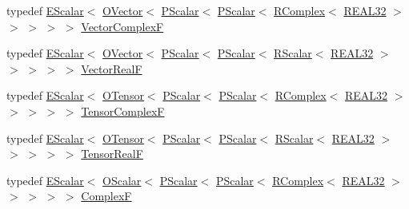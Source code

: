 \begin{DoxyCompactItemize}
\item 
typedef \mbox{\hyperlink{classENSEM_1_1EScalar}{E\+Scalar}}$<$ \mbox{\hyperlink{classENSEM_1_1OVector}{O\+Vector}}$<$ \mbox{\hyperlink{classENSEM_1_1PScalar}{P\+Scalar}}$<$ \mbox{\hyperlink{classENSEM_1_1PScalar}{P\+Scalar}}$<$ \mbox{\hyperlink{classENSEM_1_1RComplex}{R\+Complex}}$<$ \mbox{\hyperlink{namespaceENSEM_a7540d01191172323e9073283d772576d}{R\+E\+A\+L32}} $>$ $>$ $>$ $>$ $>$ \mbox{\hyperlink{group__defs_ga6a0a527d27235e5a8e8f28342eb7676f}{Vector\+ComplexF}}
\item 
typedef \mbox{\hyperlink{classENSEM_1_1EScalar}{E\+Scalar}}$<$ \mbox{\hyperlink{classENSEM_1_1OVector}{O\+Vector}}$<$ \mbox{\hyperlink{classENSEM_1_1PScalar}{P\+Scalar}}$<$ \mbox{\hyperlink{classENSEM_1_1PScalar}{P\+Scalar}}$<$ \mbox{\hyperlink{classENSEM_1_1RScalar}{R\+Scalar}}$<$ \mbox{\hyperlink{namespaceENSEM_a7540d01191172323e9073283d772576d}{R\+E\+A\+L32}} $>$ $>$ $>$ $>$ $>$ \mbox{\hyperlink{group__defs_gaa81b1a62c5846ad0db2fe60ff8f1e1b3}{Vector\+RealF}}
\item 
typedef \mbox{\hyperlink{classENSEM_1_1EScalar}{E\+Scalar}}$<$ \mbox{\hyperlink{classENSEM_1_1OTensor}{O\+Tensor}}$<$ \mbox{\hyperlink{classENSEM_1_1PScalar}{P\+Scalar}}$<$ \mbox{\hyperlink{classENSEM_1_1PScalar}{P\+Scalar}}$<$ \mbox{\hyperlink{classENSEM_1_1RComplex}{R\+Complex}}$<$ \mbox{\hyperlink{namespaceENSEM_a7540d01191172323e9073283d772576d}{R\+E\+A\+L32}} $>$ $>$ $>$ $>$ $>$ \mbox{\hyperlink{group__defs_ga7bcf210bf1e9c23606254944d97046d0}{Tensor\+ComplexF}}
\item 
typedef \mbox{\hyperlink{classENSEM_1_1EScalar}{E\+Scalar}}$<$ \mbox{\hyperlink{classENSEM_1_1OTensor}{O\+Tensor}}$<$ \mbox{\hyperlink{classENSEM_1_1PScalar}{P\+Scalar}}$<$ \mbox{\hyperlink{classENSEM_1_1PScalar}{P\+Scalar}}$<$ \mbox{\hyperlink{classENSEM_1_1RScalar}{R\+Scalar}}$<$ \mbox{\hyperlink{namespaceENSEM_a7540d01191172323e9073283d772576d}{R\+E\+A\+L32}} $>$ $>$ $>$ $>$ $>$ \mbox{\hyperlink{group__defs_ga36a49616408973774f501cbb3964c160}{Tensor\+RealF}}
\item 
typedef \mbox{\hyperlink{classENSEM_1_1EScalar}{E\+Scalar}}$<$ \mbox{\hyperlink{classENSEM_1_1OScalar}{O\+Scalar}}$<$ \mbox{\hyperlink{classENSEM_1_1PScalar}{P\+Scalar}}$<$ \mbox{\hyperlink{classENSEM_1_1PScalar}{P\+Scalar}}$<$ \mbox{\hyperlink{classENSEM_1_1RComplex}{R\+Complex}}$<$ \mbox{\hyperlink{namespaceENSEM_a7540d01191172323e9073283d772576d}{R\+E\+A\+L32}} $>$ $>$ $>$ $>$ $>$ \mbox{\hyperlink{group__defs_ga9d343936e63ca257d34c7e2198e549d7}{ComplexF}}
\item 

\end{DoxyCompactItemize}
